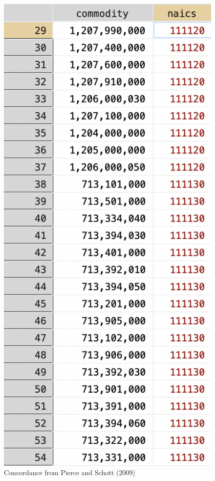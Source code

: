 \begin{figure}
    \centering
\includegraphics[scale=.4]{concordance.png}
    \caption{Concordance from Pierce and Schott (2009)}
    \label{fig:concordance}
\end{figure}

